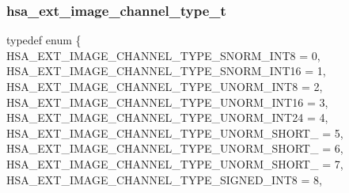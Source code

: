 \documentclass[final,oneside]{book}
\newcommand{\reftyp}[1]{#1}
\newcommand{\refenu}[1]{\reftyp{#1}}
\newenvironment{mylongtable}{\rowcolors{0}{lightgray}{lightgray}\longtable} {
\endlongtable}
\begin{document}
\subsubsection{hsa_\-ext_\-image_\-channel_\-type_\-t}
\vspace{-5.5mm}\begin{mylongtable}{@{}p{\textwidth}}
\rule{0pt}{3ex}typedef enum \{\\\hspace{1.7em}\hypertarget{group__ext-images_1ggaa143aa6feeaf24103b886c571ace568fa59d72c5a5199e360e7a5773987696e42}{\refenu{HSA_\-EXT_\-IMAGE_\-CHANNEL_\-TYPE_\-SNORM_\-INT8}} = 0,\\
\hspace{1.7em}\hypertarget{group__ext-images_1ggaa143aa6feeaf24103b886c571ace568fa55ee5e3b2e6f3b593a9cf99f1f195b91}{\refenu{HSA_\-EXT_\-IMAGE_\-CHANNEL_\-TYPE_\-SNORM_\-INT16}} = 1,\\
\hspace{1.7em}\hypertarget{group__ext-images_1ggaa143aa6feeaf24103b886c571ace568fae3100c7304a6e1805711cd6965919e53}{\refenu{HSA_\-EXT_\-IMAGE_\-CHANNEL_\-TYPE_\-UNORM_\-INT8}} = 2,\\
\hspace{1.7em}\hypertarget{group__ext-images_1ggaa143aa6feeaf24103b886c571ace568fa9a27c2852fb86761dcbabfda391a8e73}{\refenu{HSA_\-EXT_\-IMAGE_\-CHANNEL_\-TYPE_\-UNORM_\-INT16}} = 3,\\
\hspace{1.7em}\hypertarget{group__ext-images_1ggaa143aa6feeaf24103b886c571ace568fa0b12c9e8bee88608297ecd9246ebf96a}{\refenu{HSA_\-EXT_\-IMAGE_\-CHANNEL_\-TYPE_\-UNORM_\-INT24}} = 4,\\
\hspace{1.7em}\hypertarget{group__ext-images_1ggaa143aa6feeaf24103b886c571ace568fa40e1eb056776d35da9f1dbaf2e264a19}{\refenu{HSA_\-EXT_\-IMAGE_\-CHANNEL_\-TYPE_\-UNORM_\-SHORT_}} = 5,\\
\hspace{1.7em}\hypertarget{group__ext-images_1ggaa143aa6feeaf24103b886c571ace568fa6165cebe82d6c2b115bbce04548f5626}{\refenu{HSA_\-EXT_\-IMAGE_\-CHANNEL_\-TYPE_\-UNORM_\-SHORT_}} = 6,\\
\hspace{1.7em}\hypertarget{group__ext-images_1ggaa143aa6feeaf24103b886c571ace568fad5193853cc5321dd50b16eb9e920237f}{\refenu{HSA_\-EXT_\-IMAGE_\-CHANNEL_\-TYPE_\-UNORM_\-SHORT_}} = 7,\\
\hspace{1.7em}\hypertarget{group__ext-images_1ggaa143aa6feeaf24103b886c571ace568fa39b7795d032ee6afc6c701b25632b7c0}{\refenu{HSA_\-EXT_\-IMAGE_\-CHANNEL_\-TYPE_\-SIGNED_\-INT8}} = 8,\\

\end{mylongtable}
\end{document}
